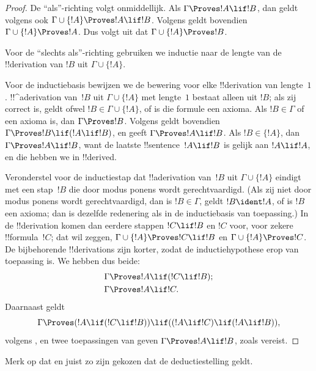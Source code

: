 \documentclass[openany]{memoir}
\begin{document}
\begin{proof}
De ``als''-richting volgt onmiddellijk. Als $\Gamma \Proves !A \lif
!B$, dan geldt volgens  ook $\Gamma \cup
\{!A\} \Proves !A \lif !B$. Volgens
 geldt bovendien $\Gamma \cup \{!A\}
\Proves !A$. Dus volgt uit  dat $\Gamma \cup
\{!A\} \Proves !B$.

Voor de ``slechts als''-richting gebruiken we inductie naar de lengte
van de !!{derivation} van $!B$ uit $\Gamma \cup \{!A\}$.

Voor de inductiebasis bewijzen we de bewering voor elke
!!{derivation} van lengte~$1$. !!^a{derivation} van~$!B$ uit $\Gamma
\cup \{!A\}$ met lengte~$1$ bestaat alleen uit $!B$; als zij correct
is, geldt ofwel $!B$$\in \Gamma \cup \{!A\}$, of is die formule een
axioma. Als $!B \in \Gamma$ of een axioma is, dan $\Gamma \Proves !B$.
Volgens  geldt bovendien $\Gamma \Proves !B \lif
(!A \lif !B)$, en  geeft $\Gamma \Proves !A \lif !B$.
Als $!B \in \{ !A\}$, dan $\Gamma \Proves !A \lif !B$, want de laatste
!!{sentence}~$!A \lif !B$ is gelijk aan $!A \lif !A$, en die hebben we
in  !!{derive}d.

Veronderstel voor de inductiestap dat !!a{derivation} van~$!B$ uit
$\Gamma \cup \{!A\}$ eindigt met een stap~$!B$ die door modus ponens
wordt gerechtvaardigd. (Als zij niet door modus ponens wordt
gerechtvaardigd, dan is $!B \in \Gamma$, geldt $!B \ident !A$, of is
$!B$ een axioma; dan is dezelfde redenering als in de inductiebasis
van toepassing.) In de !!{derivation} komen dan eerdere stappen
$!C \lif !B$ en $!C$ voor, voor zekere !!{formula}~$!C$; dat wil zeggen,
$\Gamma \cup \{!A\} \Proves !C \lif !B$ en $\Gamma \cup \{!A\}
\Proves !C$. De bijbehorende !!{derivation}s zijn korter, zodat de
inductiehypothese erop van toepassing is. We hebben dus beide:
\begin{align*}
  & \Gamma \Proves !A \lif (!C \lif !B); \\
  & \Gamma \Proves !A \lif !C.
\end{align*}
Daarnaast geldt
\[
\Gamma \Proves (!A \lif (!C \lif !B)) \lif
((!A\lif !C)  \lif (!A \lif !B)),
\]
volgens , en twee toepassingen van
 geven $\Gamma \Proves !A \lif !B$, zoals vereist.
\end{proof}

Merk op dat  en  juist zo zijn
gekozen dat de deductiestelling geldt.
\end{document}
